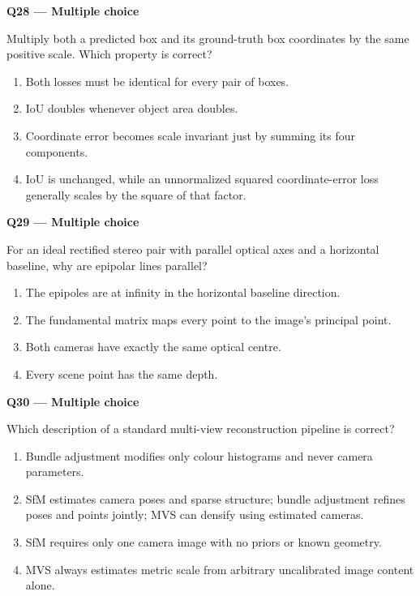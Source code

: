 \documentclass[11pt,a4paper]{article}
\begin{document}
\begin{minipage}{\linewidth}
\textbf{Q28 — Multiple choice}\par\smallskip
Multiply both a predicted box and its ground-truth box coordinates by the same positive scale. Which property is correct?
\begin{enumerate}[label=\textbf{\Alph*.}]
\item Both losses must be identical for every pair of boxes.
\item IoU doubles whenever object area doubles.
\item Coordinate error becomes scale invariant just by summing its four components.
\item IoU is unchanged,\allowbreak{} while an unnormalized squared coordinate-error loss generally scales by the square of that factor.
\end{enumerate}
\end{minipage}
\par\vspace{12pt}
\begin{minipage}{\linewidth}
\textbf{Q29 — Multiple choice}\par\smallskip
For an ideal rectified stereo pair with parallel optical axes and a horizontal baseline,\allowbreak{} why are epipolar lines parallel?
\begin{enumerate}[label=\textbf{\Alph*.}]
\item The epipoles are at infinity in the horizontal baseline direction.
\item The fundamental matrix maps every point to the image's principal point.
\item Both cameras have exactly the same optical centre.
\item Every scene point has the same depth.
\end{enumerate}
\end{minipage}
\par\vspace{12pt}
\begin{minipage}{\linewidth}
\textbf{Q30 — Multiple choice}\par\smallskip
Which description of a standard multi-view reconstruction pipeline is correct?
\begin{enumerate}[label=\textbf{\Alph*.}]
\item Bundle adjustment modifies only colour histograms and never camera parameters.
\item SfM estimates camera poses and sparse structure; bundle adjustment refines poses and points jointly; MVS can densify using estimated cameras.
\item SfM requires only one camera image with no priors or known geometry.
\item MVS always estimates metric scale from arbitrary uncalibrated image content alone.
\end{enumerate}
\end{minipage}
\end{document}

